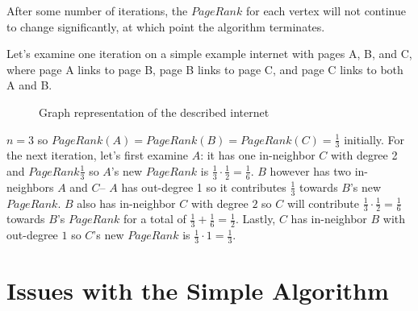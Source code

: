 \documentclass{article}
\begin{document}
After some number of iterations, the $PageRank$ for each vertex will not continue to change significantly, at which point the algorithm terminates.

\medskip
Let's examine one iteration on a simple example internet with pages A, B, and C, where page A links to page B, page B links to page C, and page C links to both A and B.

\begin{figure}[H]
    \begin{center}
    \end{center}
    \caption{Graph representation of the described internet}
    \label{fig:F1}
\end{figure}

\medskip

$n = 3$ so $PageRank(A) = PageRank(B) = PageRank(C) = \frac{1}{3}$ initially. For the next iteration, let's first examine $A$: it has one in-neighbor $C$ with degree 2 and $PageRank \frac{1}{3}$ so $A$'s new $PageRank$ is $\frac{1}{3} \cdot \frac{1}{2} = \frac{1}{6}$. $B$ however has two in-neighbors $A$ and $C$-- $A$ has out-degree 1 so it contributes $\frac{1}{3}$ towards $B$'s new $PageRank$. $B$ also has in-neighbor $C$ with degree $2$ so $C$ will contribute $\frac{1}{3} \cdot \frac{1}{2} = \frac{1}{6}$ towards $B$'s $PageRank$ for a total of $\frac{1}{3} + \frac{1}{6} = \frac{1}{2}$. Lastly, $C$ has in-neighbor $B$ with out-degree $1$ so $C$'s new $PageRank$ is $\frac{1}{3} \cdot 1 = \frac{1}{3}$.

\section{Issues with the Simple Algorithm}
\end{document}
